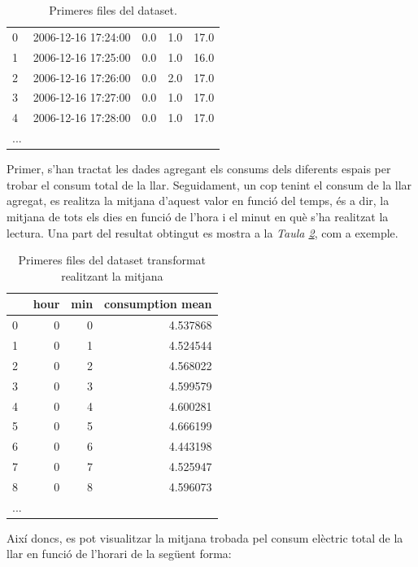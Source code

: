 \begin{itemize}
\begin{table}[H]
\begin{tabular}{llrrr}
				\midrule
				0 & 2006-12-16 17:24:00 &             0.0 &             1.0 &            17.0 \\
				1 & 2006-12-16 17:25:00 &             0.0 &             1.0 &            16.0 \\
				2 & 2006-12-16 17:26:00 &             0.0 &             2.0 &            17.0 \\
				3 & 2006-12-16 17:27:00 &             0.0 &             1.0 &            17.0 \\
				4 & 2006-12-16 17:28:00 &             0.0 &             1.0 &            17.0 \\
				...\\
				\bottomrule
			\end{tabular}
		\caption{Primeres files del dataset.}
		\label{tab:ex-kaggle}
	\end{table}
	Primer, s'han tractat les dades agregant els consums dels diferents espais per trobar el consum total de la llar. Seguidament, un cop tenint el consum de la llar agregat, es realitza la mitjana d'aquest valor en funció del temps, és a dir, la mitjana de tots els dies en funció de l'hora i el minut en què s'ha realitzat la lectura. Una part del resultat obtingut es mostra a la \textit{Taula \ref{tab:ex-kaggle-mean}}, com a exemple.
	\begin{table}[H]
		\centering
		\begin{tabular}{lrrr}
			\toprule
			{} & hour & min & consumption mean \\
			\midrule
			0 &    0 &   0 &    4.537868 \\
			1 &    0 &   1 &    4.524544 \\
			2 &    0 &   2 &    4.568022 \\
			3 &    0 &   3 &    4.599579 \\
			4 &    0 &   4 &    4.600281 \\
			5 &    0 &   5 &    4.666199 \\
			6 &    0 &   6 &    4.443198 \\
			7 &    0 &   7 &    4.525947 \\
			8 &    0 &   8 &    4.596073 \\
			...\\
			\bottomrule
		\end{tabular}
	\caption{Primeres files del dataset transformat realitzant la mitjana}
	\label{tab:ex-kaggle-mean}
	\end{table}
	   Així doncs, es pot visualitzar la mitjana trobada pel consum elèctric total de la llar en funció de l'horari de la següent forma:

\end{itemize}
